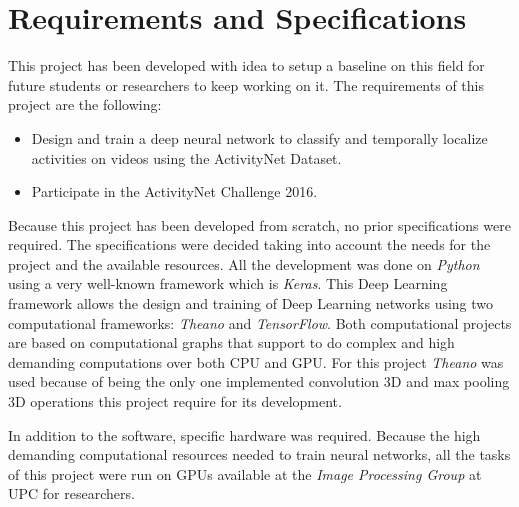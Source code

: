 \section{Requirements and Specifications}

This project has been developed with idea to setup a baseline on this field for future students or researchers to keep working on it. The requirements of this project are the following:
\begin{itemize}
    \item Design and train a deep neural network to classify and temporally localize activities on videos using the ActivityNet Dataset.
    \item Participate in the ActivityNet Challenge 2016.
\end{itemize}


Because this project has been developed from scratch, no prior specifications were required. The specifications were decided taking into account the needs for the project and the available resources. All the development was done on \textit{Python} using a very well-known framework which is \textit{Keras}. This Deep Learning framework allows the design and training of Deep Learning networks using two computational frameworks: \textit{Theano}\cite{theano2016theano} and \textit{TensorFlow}\cite{abadi2016tensorflow}. Both computational projects are based on computational graphs that support to do complex and high demanding computations over both CPU and GPU. For this project \textit{Theano} was used because of being the only one implemented convolution 3D and max pooling 3D operations this project require for its development.

In addition to the software, specific hardware was required. Because the high demanding computational resources needed to train neural networks, all the tasks of this project were run on GPUs available at the \textit{Image Processing Group} at UPC for researchers.


